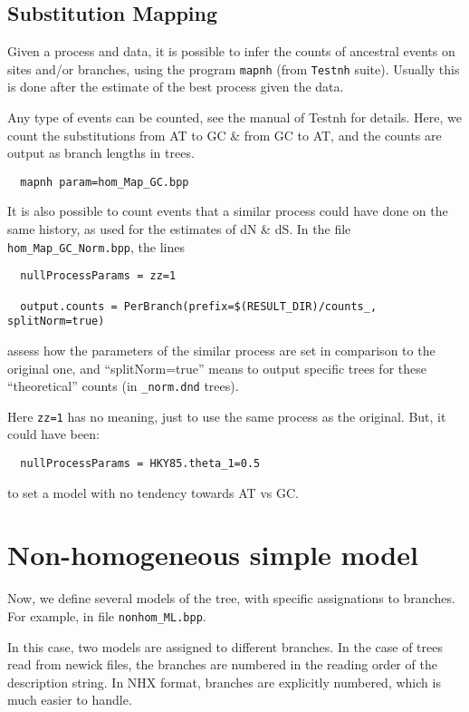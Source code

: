 \documentclass{article}
\begin{document}
\subsection*{Substitution Mapping}

Given a process and data, it is possible to infer the counts of
ancestral events on sites and/or branches, using the program
\texttt{mapnh} (from \texttt{Testnh} suite). Usually this is done
after the estimate of the best process given the data.

Any type of events can be counted, see the manual of Testnh for
details. Here, we count the substitutions from AT to GC \& from GC to
AT, and the counts are output as branch lengths in trees. 

\begin{verbatim}
  mapnh param=hom_Map_GC.bpp
\end{verbatim}

It is also possible to count events that a similar process could have
done on the same history, as used for the estimates of dN \& dS. In the
file \texttt{hom\_Map\_GC\_Norm.bpp}, the lines


\begin{verbatim}
  nullProcessParams = zz=1

  output.counts = PerBranch(prefix=$(RESULT_DIR)/counts_, splitNorm=true)
\end{verbatim}

assess how the parameters of the similar process are set in comparison
to the original one, and ``splitNorm=true'' means to output specific
trees for these ``theoretical'' counts (in \texttt{\_norm.dnd} trees).

Here \texttt{zz=1} has no meaning, just to use the same process as the
original. But, it could have been:

\begin{verbatim}
  nullProcessParams = HKY85.theta_1=0.5
\end{verbatim}

to set a model with no tendency towards AT vs GC.


\section{Non-homogeneous simple model}

Now, we define several models of the tree, with specific assignations
to branches. For example, in file \verb#nonhom_ML.bpp#.

In this case, two models are assigned to different branches. In the
case of trees read from newick files, the branches are numbered in the
reading order of the description string. In NHX format, branches are
explicitly numbered, which is much easier to handle.
\end{document}
